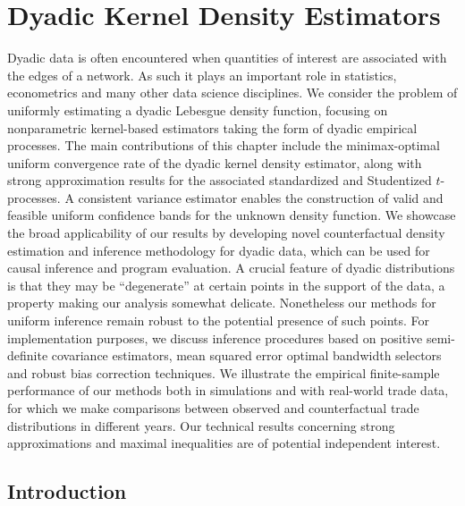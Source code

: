 
\chapter{Dyadic Kernel Density Estimators}
\label{ch:kernel}

Dyadic data is often encountered when quantities of interest are associated
with the edges of a network. As such it plays an important role in statistics,
econometrics and many other data science disciplines. We consider the problem
of uniformly estimating a dyadic Lebesgue density function, focusing on
nonparametric kernel-based estimators taking the form of dyadic empirical
processes. The main contributions of this chapter
include the minimax-optimal uniform
convergence rate of the dyadic kernel density estimator, along with strong
approximation results for the associated standardized and Studentized
$t$-processes. A consistent variance estimator enables the construction of
valid and feasible uniform confidence bands for the unknown density function.
We showcase the broad applicability of our results by developing novel
counterfactual density estimation and inference methodology for dyadic data,
which can be used for causal inference and program evaluation. A crucial
feature of dyadic distributions is that they may be ``degenerate'' at certain
points in the support of the data, a property making our analysis somewhat
delicate. Nonetheless our methods for uniform inference remain robust to the
potential presence of such points. For implementation purposes, we discuss
inference procedures based on positive semi-definite covariance estimators,
mean squared error optimal bandwidth selectors and robust bias correction
techniques. We illustrate the empirical finite-sample performance of our
methods both in simulations and with real-world trade data, for which we make
comparisons between observed and counterfactual trade distributions in
different years. Our technical results concerning strong approximations and
maximal inequalities are of potential independent interest.

\section{Introduction}
\label{sec:introduction}


